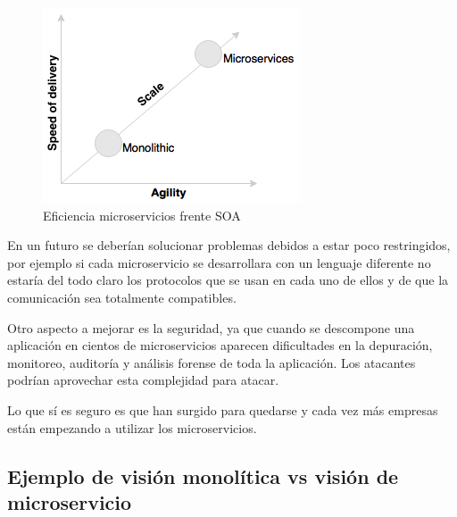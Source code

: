 \documentclass[12pt]{report} %
\begin{document}
\begin{figure}
	\centering
	\includegraphics[width=0.7\linewidth]{imagenes/desarrolloMonovsMicro}
	\caption{Eficiencia microservicios frente SOA}
	\label{fig:desarrollomonovsmicro}
\end{figure}

En un futuro se deberían solucionar problemas debidos a estar poco restringidos, por ejemplo si cada microservicio se desarrollara con un lenguaje diferente no estaría del todo claro los protocolos que se usan en cada uno de ellos y de que la comunicación sea totalmente compatibles. 

Otro aspecto a mejorar es la seguridad, ya que cuando se descompone una aplicación en cientos de microservicios aparecen dificultades en la depuración, monitoreo, auditoría y análisis forense de toda la aplicación. Los atacantes podrían aprovechar esta complejidad para atacar. 

Lo que sí es seguro es que han surgido para quedarse y cada vez más empresas están empezando a utilizar los microservicios.


\subsection{Ejemplo de visión monolítica vs visión de microservicio}
\end{document}
